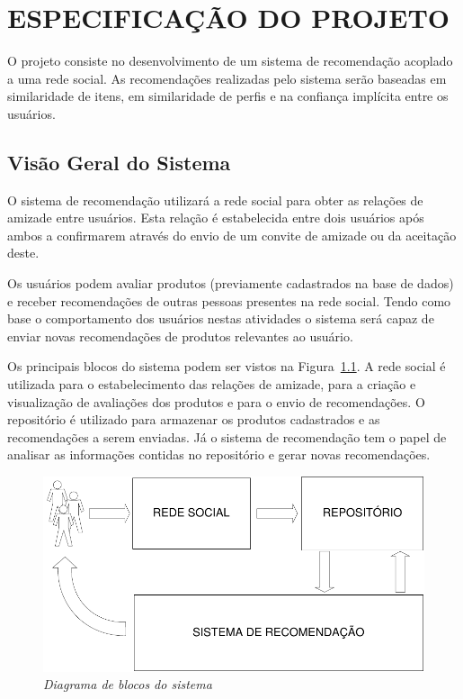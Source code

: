 \chapter{ESPECIFICAÇÃO DO PROJETO} %
\label{cha:especificacao_do_projeto}

 O projeto consiste no desenvolvimento de um sistema de recomendação acoplado a uma rede social. As recomendações realizadas pelo sistema serão baseadas em similaridade de itens, em similaridade de perfis e na confiança implícita entre os usuários.

\section{Visão Geral do Sistema} %
\label{sec:visao_do_sistema}

O sistema de recomendação utilizará a rede social para obter as relações de amizade entre usuários. Esta relação é estabelecida entre dois usuários após ambos a confirmarem através do envio de um convite de amizade ou da aceitação deste.

Os usuários podem avaliar produtos (previamente cadastrados na base de dados) e receber recomendações de outras pessoas presentes na rede social. Tendo como base o comportamento dos usuários nestas atividades o sistema será capaz de enviar novas recomendações de produtos relevantes ao usuário.

 Os principais blocos do sistema podem ser vistos na Figura~\ref{fig:escopo}. A rede social é utilizada para o estabelecimento das relações de amizade, para a criação e visualização de avaliações dos produtos e para o envio de recomendações. O repositório é utilizado para armazenar os produtos cadastrados e as recomendações a serem enviadas. Já o sistema de recomendação tem o papel de analisar as informações contidas no repositório e gerar novas recomendações.

\begin{figure}
  \centering
  \includegraphics[width=\textwidth]{imagens/Diagrama_Visao_Geral}
  \caption{\it Diagrama de blocos do sistema}
  \label{fig:escopo}
\end{figure}


